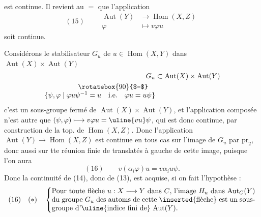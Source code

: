 est continue. Il revient au $=$ que l'application
\[
(15)\qquad\begin{aligned}
\operatorname{Aut}(Y)&\longrightarrow\operatorname{Hom}(X,Z)\\
\varphi&\longmapsto v\varphi u
\end{aligned}
\]
soit continue.

Considérons  le stabilisateur 
$G_u$ de $u\in\operatorname{Hom}(X,Y)$ dans $\operatorname{Aut}(X)\times\operatorname{Aut}(Y)$
\[
\begin{aligned}
G_u&\subset\operatorname{Aut}(X)\times\operatorname{Aut}(Y)\\
\rotatebox{90}{$=$}\quad&\\[-1ex]
\{\psi,\varphi\mid\varphi u\psi^{-1}=u\quad\text{i.e.}\quad\varphi u=u\psi\}&
\end{aligned}
\]
c'est un sous-groupe fermé de $\operatorname{Aut}(X)\times\operatorname{Aut}(Y)$,
et l'application composée
n'est autre que $(\psi,\varphi)\longmapsto v\varphi u=\uline{vu}\psi$, qui est
donc continue, par construction de la top. de
$\operatorname{Hom}(X,Z)$. Donc l'application $\operatorname{Aut}(Y)\longrightarrow\operatorname{Hom}(X,Z)$
est continue en tous cas sur l'image  de $G_u$
par $\mathrm{pr}_2$,  donc aussi sur tte réunion
finie de translatés à gauche  de cette image,
puisque l'on aura 
\[
(16)\qquad v(\alpha_i\varphi)u=v\alpha_i u\psi.
\]
Donc la continuité de (14), donc de (13), est
acquise, si on fait l'hypothèse :
\[
(16)\quad(*)\quad\left\{
\begin{minipage}{0.83\linewidth}
Pour toute flèche $u:X\longrightarrow Y$ dans $C$, l'image
$H_u$ dans $\operatorname{Aut}_C(Y)$ du groupe $G_u$ des automs de cette
\inserted{flèche} est un sous-groupe d'\uline{indice fini de}
$\operatorname{Aut}(Y)$.
\end{minipage}\right.
\]
